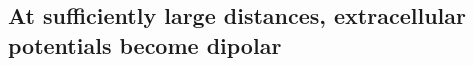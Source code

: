 \documentclass[preprint,10pt,authoryear]{elsarticle}
\begin{document}
\subsection{At sufficiently large distances, extracellular potentials become dipolar}\label{subsec:cb_db_comp_inf}
%
\end{document}
